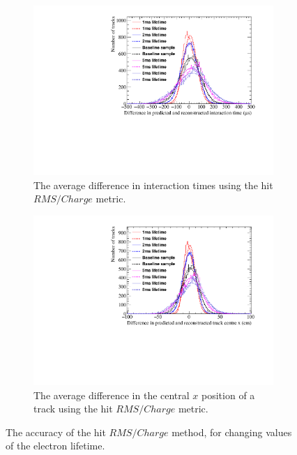 \begin{figure}[h!]
  \centering
  \begin{subfigure}{0.6\textwidth}
    \centering
    \includegraphics[width=\textwidth]{Canvas_AvDiff_T_RMS_Q_ElecLifetime}
    \caption{The average difference in interaction times using the hit $RMS/Charge$ metric.}
    \label{fig:DiffLifeStudy_AvDiff_RMS_Int_T}
  \end{subfigure}
  \begin{subfigure}{0.6\textwidth}
    \centering
    \includegraphics[width=\textwidth]{Canvas_AvDiff_X_RMS_Q_ElecLifetime}
    \caption{The average difference in the central $x$ position of a track using the hit $RMS/Charge$ metric.}
    \label{fig:DiffLifeStudy_AvDiff_RMS_Int_X}
  \end{subfigure}
  \caption[Comparing the accuracy of the hit $RMS$ method, as the electron lifetime changes]
          {The accuracy of the hit $RMS/Charge$ method, for changing values of the electron lifetime. }
  \label{fig:DiffLifeStudy_AvDiff_RMS_Int}
\end{figure}

